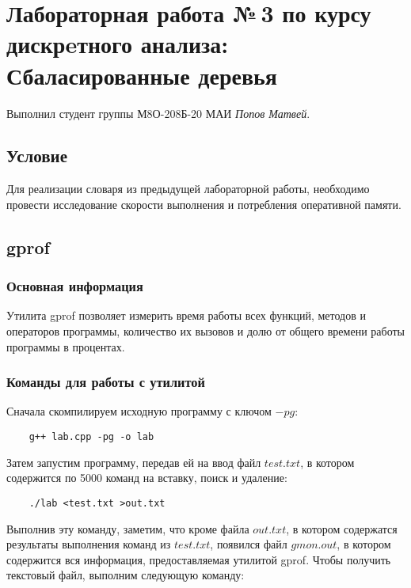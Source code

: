 \documentclass[12pt]{article}
\begin{document}
\section*{Лабораторная работа №\,3 по курсу дискрeтного анализа: Сбаласированные деревья}

Выполнил студент группы М8О-208Б-20 МАИ \textit{Попов Матвей}.

\subsection*{Условие}

Для реализации словаря из предыдущей лабораторной работы,
необходимо провести исследование скорости выполнения и потребления
оперативной памяти.

\subsection*{gprof}

\subsubsection*{Основная информация}

Утилита gprof позволяет измерить время работы всех функций, методов и операторов
программы, количество их вызовов и долю от общего времени работы программы в 
процентах.

\subsubsection*{Команды для работы с утилитой}

Сначала скомпилируем исходную программу с ключом $-pg$:

\begin{lstlisting}
    g++ lab.cpp -pg -o lab
\end{lstlisting}

Затем запустим программу, передав ей на ввод файл $test.txt$, в котором 
содержится по 5000 команд на вставку, поиск и удаление:

\begin{lstlisting}
    ./lab <test.txt >out.txt
\end{lstlisting}

Выполнив эту команду, заметим, что кроме файла $out.txt$, в котором содержатся 
результаты выполнения команд из $test.txt$, появился файл $gmon.out$, в котором
содержится вся информация, предоставляемая утилитой gprof. Чтобы получить 
текстовый файл, выполним следующую команду:
\end{document}
